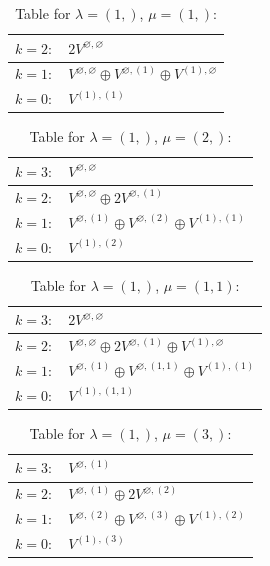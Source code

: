 \documentclass[a4paper,12pt]{article}
\begin{document}
\renewcommand{\arraystretch}{1.6} 
\begin{table}[H]
\centering
\caption{Table for $\lambda = (1,)$, $\mu = (1,)$:}
\begin{tabular}{|>{\centering\arraybackslash}p{15cm}|}
\hline
 $k = 2: \quad 2 V^{\varnothing, \varnothing} $ \\ \hline
 $k = 1: \quad V^{\varnothing, \varnothing} \oplus V^{\varnothing, (1)} \oplus V^{(1), \varnothing} $ \\ \hline
 $k = 0: \quad V^{(1), (1)} $ \\ \hline
\end{tabular}
\end{table}

\renewcommand{\arraystretch}{1.6} 
\begin{table}[H]
\centering
\caption{Table for $\lambda = (1,)$, $\mu = (2,)$:}
\begin{tabular}{|>{\centering\arraybackslash}p{15cm}|}
\hline
 $k = 3: \quad V^{\varnothing, \varnothing} $ \\ \hline
 $k = 2: \quad V^{\varnothing, \varnothing} \oplus 2 V^{\varnothing, (1)} $ \\ \hline
 $k = 1: \quad V^{\varnothing, (1)} \oplus V^{\varnothing, (2)} \oplus V^{(1), (1)} $ \\ \hline
 $k = 0: \quad V^{(1), (2)} $ \\ \hline
\end{tabular}
\end{table}

\renewcommand{\arraystretch}{1.6} 
\begin{table}[H]
\centering
\caption{Table for $\lambda = (1,)$, $\mu = (1, 1)$:}
\begin{tabular}{|>{\centering\arraybackslash}p{15cm}|}
\hline
 $k = 3: \quad 2 V^{\varnothing, \varnothing} $ \\ \hline
 $k = 2: \quad V^{\varnothing, \varnothing} \oplus 2 V^{\varnothing, (1)} \oplus V^{(1), \varnothing} $ \\ \hline
 $k = 1: \quad V^{\varnothing, (1)} \oplus V^{\varnothing, (1, 1)} \oplus V^{(1), (1)} $ \\ \hline
 $k = 0: \quad V^{(1), (1, 1)} $ \\ \hline
\end{tabular}
\end{table}

\renewcommand{\arraystretch}{1.6} 
\begin{table}[H]
\centering
\caption{Table for $\lambda = (1,)$, $\mu = (3,)$:}
\begin{tabular}{|>{\centering\arraybackslash}p{15cm}|}
\hline
 $k = 3: \quad V^{\varnothing, (1)} $ \\ \hline
 $k = 2: \quad V^{\varnothing, (1)} \oplus 2 V^{\varnothing, (2)} $ \\ \hline
 $k = 1: \quad V^{\varnothing, (2)} \oplus V^{\varnothing, (3)} \oplus V^{(1), (2)} $ \\ \hline
 $k = 0: \quad V^{(1), (3)} $ \\ \hline
\end{tabular}
\end{table}
\end{document}
